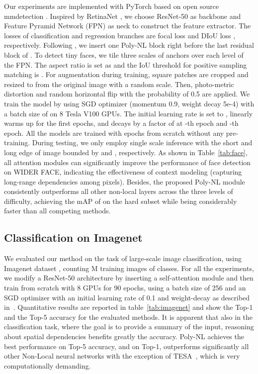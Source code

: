\documentclass[10pt,twocolumn,letterpaper]{article}
\begin{document}
Our experiments are implemented with PyTorch based on open source mmdetection \cite{chen2019mmdetection}. Inspired by RetinaNet \cite{lin2017focal}, we choose ResNet-50 \cite{he2016deep} as backbone and Feature Pyramid Network (FPN) \cite{lin2017feature} as neck to construct the feature extractor. The losses of classification and regression branches are focal loss \cite{lin2017focal} and DIoU loss \cite{zheng2020distance}, respectively. Following \cite{wang2018non}, we insert one Poly-NL block right before the last residual block of . To detect tiny faces, we tile three scales of anchors over each level of the FPN. The aspect ratio is set as  and the IoU threshold for positive sampling matching is . For augmentation during training, square patches are cropped and resized to  from the original image with a random scale. Then, photo-metric distortion and random horizontal flip with the probability of 0.5 are applied. We train the model by using SGD optimizer (momentum 0.9, weight decay 5e-4) with a batch size of  on 8 Tesla V100 GPUs. The initial learning rate is set to , linearly warms up for the first  epochs, and decays by a factor of  at -th epoch and -th epoch. All the models are trained with  epochs from scratch without any pre-training. During testing, we only employ single scale inference with the short and long edge of image bounded by  and , respectively. As shown in Table~\ref{tab:face}, all attention modules can significantly improve the performance of face detection on WIDER FACE, indicating the effectiveness of context modeling (\ie capturing long-range dependencies among pixels). Besides, the proposed Poly-NL module consistently outperforms all other non-local layers across the three levels of difficulty, achieving the mAP of  on the hard subset while being considerably faster than all competing methods.

\subsection{Classification on Imagenet}
We evaluated our method on the task of large-scale image classification, using Imagenet dataset \cite{russakovsky2015imagenet}, counting M training images of  classes. For all the experiments, we modify a ResNet-50 architecture \cite{he2016deep} by inserting a self-attention module and then train from scratch with 8 GPUs for 90 epochs, using a batch size of 256 and an SGD optimizer with an initial learning rate of 0.1 and weight-decay as described in~\cite{goyal2017accurate}. Quantitative results are reported in table~\eqref{tab:imagenet} and show the Top-1 and the Top-5 accuracy for the evaluated methods. It is apparent that also in the classification task, where the goal is to provide a summary of the input, reasoning about spatial dependencies benefits greatly the accuracy. Poly-NL achieves the best performance on Top-5 accuracy, and on Top-1, outperforms significantly all other Non-Local neural networks with the exception of TESA~\cite{babiloni2020tesa}, which is very computationally demanding. 
\end{document}
